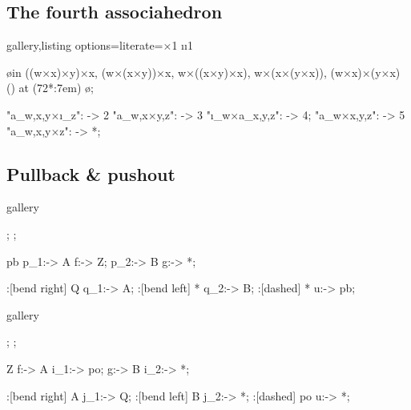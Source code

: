 \clearpage

\subsection{The fourth associahedron}

\begin{tcblisting}{gallery,listing options={literate={×}{{\texttimes}}1 {ı}{{\i}}1}}
\begin{codi}

  \foreach [count=\n] \o in {
      ((w×x)×y)×x,
      (w×(x×y))×x,
      w×((x×y)×x),
      w×(x×(y×x)),
      (w×x)×(y×x)
    } \obj (\n) at (72*\n:7em) {\o};

   "a_{w,x,y}×ı_z": -> 2
           "a_{w,x×y,z}": -> 3
         "ı_w×a_{x,y,z}": -> 4;
  \mor *   "a_{w×x,y,z}": -> 5
           "a_{w,x,y×z}": -> *;
\end{codi}
\end{tcblisting}

\clearpage

\subsection{Pullback \& pushout}

\begin{tcblisting}{gallery}
\begin{codi}[hexagonal]
  ;
  ;

  \mor[swap] pb p_1:-> A f:-> Z;
  \mor        * p_2:-> B g:-> *;

  \mor[swap]:[bend right] Q q_1:-> A;
  \mor      :[bend left]  * q_2:-> B;
  \mor [mid]:[dashed]     *   u:-> pb;
\end{codi}
\end{tcblisting}

\begin{tcblisting}{gallery}
\begin{codi}[hexagonal]
  ;
  ;

  \mor[swap] Z f:-> A i_1:-> po;
  \mor       * g:-> B i_2:-> *;

  \mor[swap]:[bend right]  A j_1:-> Q;
  \mor      :[bend left]   B j_2:-> *;
  \mor [mid]:[dashed]     po   u:-> *;
\end{codi}
\end{tcblisting}

